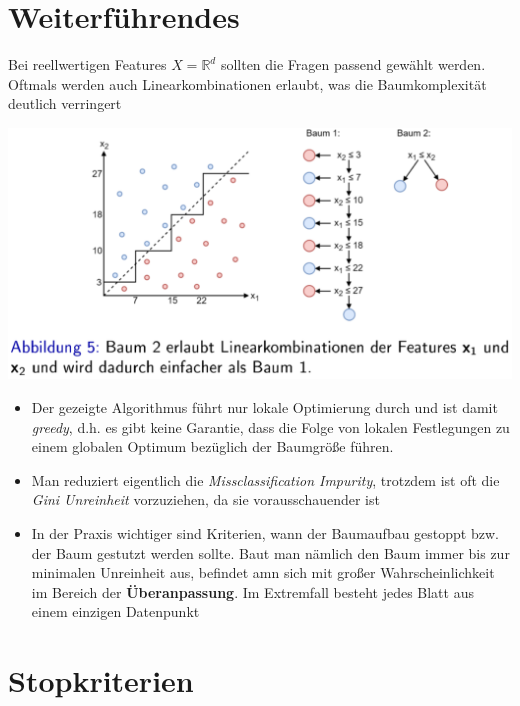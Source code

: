 \documentclass{report}
\begin{document}
  \section{Weiterführendes}	
  
  Bei reellwertigen Features $X = \mathbb{R}^d$ sollten die Fragen passend gewählt werden. Oftmals werden auch	
  Linearkombinationen erlaubt, was die Baumkomplexität deutlich verringert	
  
  \begin{center}	
    \includegraphics[scale=.3]{ml07_25}	
  \end{center}	
  
  \vspace*{-1.5em}	
  \begin{itemize}	
    \item Der gezeigte Algorithmus führt nur lokale Optimierung durch und ist damit \textit{greedy}, d.h. es gibt keine Garantie,	
    dass die Folge von lokalen Festlegungen zu einem globalen Optimum bezüglich der Baumgröße führen.	
    \item Man reduziert eigentlich die \textit{Missclassification Impurity}, trotzdem ist oft die \textit{Gini Unreinheit}	
    vorzuziehen, da sie vorausschauender ist	
    \item In der Praxis wichtiger sind Kriterien, wann der Baumaufbau gestoppt bzw. der Baum gestutzt werden sollte. Baut	
    man nämlich den Baum immer bis zur minimalen Unreinheit aus, befindet amn sich mit großer Wahrscheinlichkeit im	
    Bereich der \textbf{Überanpassung}. Im Extremfall besteht jedes Blatt aus einem einzigen Datenpunkt	
  \end{itemize}	
  
  \section{Stopkriterien}	
  
\end{document}
